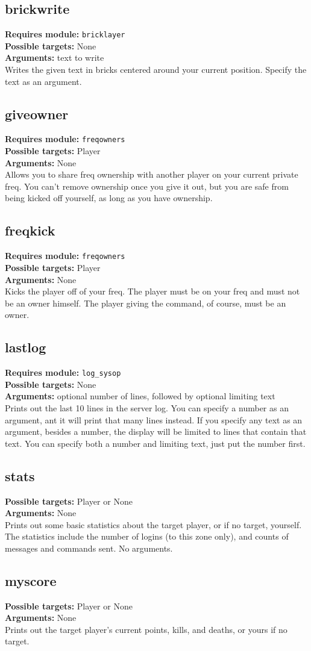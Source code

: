 \documentclass{article}
\newcommand{\requiremod}[1]{\noindent\textbf{Requires module:} \texttt{#1}\\}
\newcommand{\targets}[1]{\noindent\textbf{Possible targets:} #1\\}
\newcommand{\args}[1]{\noindent\textbf{Arguments:} #1\\}
\begin{document}
\subsection{brickwrite}  %
\requiremod{bricklayer}
\targets{None}
\args{text to write}
Writes the given text in bricks centered around your current position.
Specify the text as an argument.

\subsection{giveowner}  %
\requiremod{freqowners}
\targets{Player}
\args{None}
Allows you to share freq ownership with another player on your current
private freq. You can't remove ownership once you give it out, but you
are safe from being kicked off yourself, as long as you have ownership.

\subsection{freqkick}  %
\requiremod{freqowners}
\targets{Player}
\args{None}
Kicks the player off of your freq. The player must be on your freq and
must not be an owner himself. The player giving the command, of course,
must be an owner.

\subsection{lastlog}  %
\requiremod{log\_sysop}
\targets{None}
\args{optional number of lines, followed by optional limiting text}
Prints out the last 10 lines in the server log. You can specify a number
as an argument, ant it will print that many lines instead. If you
specify any text as an argument, besides a number, the display will be
limited to lines that contain that text. You can specify both a number
and limiting text, just put the number first.

\subsection{stats}  %
\targets{Player or None}
\args{None}
Prints out some basic statistics about the target player, or if no
target, yourself. The statistics include the number of logins (to this
zone only), and counts of messages and commands sent. No arguments.

\subsection{myscore}  %
\targets{Player or None}
\args{None}
Prints out the target player's current points, kills, and deaths, or
yours if no target.
\end{document}
